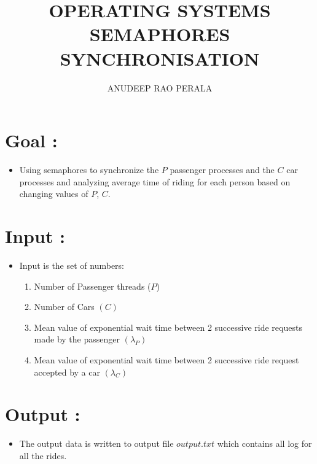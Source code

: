 \documentclass[12pt,a4paper]{article}
\title{OPERATING SYSTEMS \\ SEMAPHORES SYNCHRONISATION}
\author{ANUDEEP RAO PERALA}
\date{}
\begin{document}
	\maketitle
	
	\tableofcontents
	\newpage
	
	\section{Goal :}
	\begin{itemize}
		\item Using semaphores to synchronize the $P$ passenger processes and the $C$ car processes and analyzing average time of riding for each person based on changing values of $P$, $C$.
	\end{itemize}
	\section{Input :}
	\begin{itemize}
		\item Input is the set of numbers:
		\begin{enumerate}
			\item Number of Passenger threads ($P$)
			\item Number of Cars $(C)$
			\item Mean value of exponential wait time between 2 successive ride requests made by the passenger $(\lambda _P)$
\item Mean value of exponential wait time between 2 successive ride request accepted by a car $(\lambda _C)$
		\end{enumerate}
		
	\end{itemize}
	\section{Output :}
	\begin{itemize}
		\item The output data is written to output file $output.txt$ which contains all log for all the rides.
	\end{itemize}
	
\end{document}
